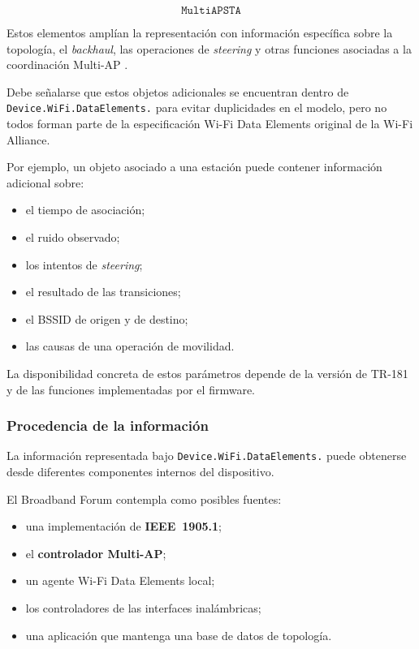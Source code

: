 \[
    \texttt{MultiAPSTA}
\]

Estos elementos amplían la representación con información específica
sobre la topología, el \textit{backhaul}, las operaciones de
\textit{steering} y otras funciones asociadas a la coordinación
Multi-AP \cite{bbf_tr181}.

Debe señalarse que estos objetos adicionales se encuentran dentro de
\texttt{Device.WiFi.DataElements.} para evitar duplicidades en el modelo,
pero no todos forman parte de la especificación Wi-Fi Data Elements
original de la Wi-Fi Alliance.

Por ejemplo, un objeto asociado a una estación puede contener información
adicional sobre:

\begin{itemize}
    \item el tiempo de asociación;
    \item el ruido observado;
    \item los intentos de \textit{steering};
    \item el resultado de las transiciones;
    \item el BSSID de origen y de destino;
    \item las causas de una operación de movilidad.
\end{itemize}

La disponibilidad concreta de estos parámetros depende de la versión de
TR-181 y de las funciones implementadas por el firmware.


\subsubsection*{Procedencia de la información}

La información representada bajo
\texttt{Device.WiFi.DataElements.} puede obtenerse desde diferentes
componentes internos del dispositivo.

El Broadband Forum contempla como posibles fuentes:

\begin{itemize}
    \item una implementación de \textbf{IEEE~1905.1};
    \item el \textbf{controlador Multi-AP};
    \item un agente Wi-Fi Data Elements local;
    \item los controladores de las interfaces inalámbricas;
    \item una aplicación que mantenga una base de datos de topología.
\end{itemize}

